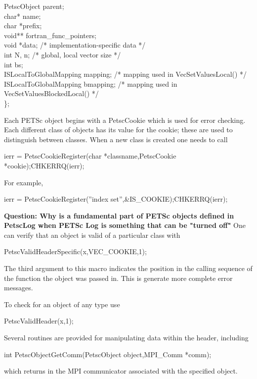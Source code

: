 \documentclass[twoside,12pt]{../sty/report_petsc}
\begin{document}
\begin{tabbing}
  PetscObject            parent;                                  \\
  char*                  name;                                    \\
  char                   *prefix;                                 \\
  void**                 fortran\_func\_pointers;       \\
  void                   *data;     /* implementation-specific data */\\
  int                    N, n;      /* global, local vector size */\\
  int                    bs;\\
  ISLocalToGlobalMapping mapping;   /* mapping used in VecSetValuesLocal() */\\
  ISLocalToGlobalMapping bmapping;  /* mapping used in VecSetValuesBlockedLocal() */\\
\};
\end{tabbing}

Each PETSc object begins with a PetscCookie which is used for error checking.
Each different class of objects has its value for the cookie; these are used
to distinguish between classes. When a new class is created one needs to call
\begin{tabbing}
  ierr = PetscCookieRegister(char *classname,PetscCookie *cookie);CHKERRQ(ierr);
\end{tabbing}
For example,
\begin{tabbing}
  ierr = PetscCookieRegister(''index set'',\&IS\_COOKIE);CHKERRQ(ierr);
\end{tabbing}
{\bf Question: Why is a fundamental part of PETSc objects defined in PetscLog when PETSc Log
is something that can be "turned off"} One can verify that an object is valid of a particular
class with 
\begin{tabbing}
  PetscValidHeaderSpecific(x,VEC\_COOKIE,1);
\end{tabbing}
The third argument to this macro indicates the position in the calling sequence of the 
function the object was passed in. This is generate more complete error messages.

To check for an object of any type use
\begin{tabbing}
  PetscValidHeader(x,1);
\end{tabbing}


Several routines are provided for manipulating data within the header,
including
\begin{tabbing}
   int PetscObjectGetComm(PetscObject object,MPI\_Comm *comm);
\end{tabbing}
which returns in   the MPI communicator associated with the
specified object.
\end{document}

